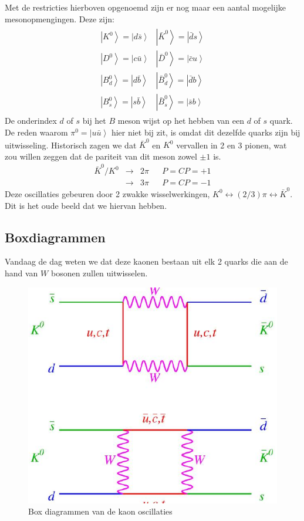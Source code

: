 \documentclass[../main.tex]{subfiles}
\begin{document}
Met de restricties hierboven opgenoemd zijn er nog maar een aantal mogelijke mesonopmengingen. Deze zijn:
\begin{equation}
    \begin{aligned}
        \label{eq:mogelijke_meson_opmengingen}
        \begin{array}{ll}
            \left|K^{0}\right>=\left| d \bar{s}\right> & \left|\bar{K}^{0}\right>=\left| \bar{d} s\right> \\
            \left|D^{0}\right>=\left| c \bar{u}\right> & \left|\bar{D}^{0}\right>=\left| \bar{c} u\right> \\
            \left|B_{d}^{0}\right>=\left| d \bar{b}\right> & \left|\bar{B}_{d}^{0}\right>=\left| \bar{d} b\right> \\
            \left|B_{s}^{0}\right>=\left| s \bar{b}\right> & \left|\bar{B}_{s}^{0}\right>=\left| \bar{s} b\right>
        \end{array}
    \end{aligned}
\end{equation}
De onderindex $d$ of $s$ bij het $B$ meson wijst op het hebben van een $d$ of $s$ quark. De reden waarom $\pi^0=\left|u\bar{u}\right>$ hier niet bij zit, is omdat dit dezelfde quarks zijn bij uitwisseling. Historisch zagen we dat $\bar{K}^{0}$ en $K^{0}$ vervallen in 2 en 3 pionen, wat zou willen zeggen dat de pariteit van dit meson zowel $\pm1$ is.
\begin{equation}
    \begin{aligned}
        \label{eq:kaon_pion_verval}
            \bar{K}^{0} / K^{0} & \rightarrow & 2 \pi & & P=C P=+1 \\
                                & \rightarrow & 3 \pi & & P=C P=-1
    \end{aligned}
\end{equation}
Deze oscillaties gebeuren door 2 zwakke wisselwerkingen, $K^{0} \leftrightarrow(2 / 3) \pi \leftrightarrow \bar{K}^{0}$. Dit is het oude beeld dat we hiervan hebben.

\subsection{Boxdiagrammen}%
\label{sub:box_diagrammen}

Vandaag de dag weten we dat deze kaonen bestaan uit elk 2 quarks die aan de hand van $W$ bosonen zullen uitwisselen.

\begin{figure}[h]
    \centering
    \includegraphics[width=0.4\linewidth]{meson_mixing_and_oscillations/box_diagrams.png}
    \caption{Box diagrammen van de kaon oscillaties}%
    \label{fig:meson_mixing_and_oscillations/box_diagrams}
\end{figure}
\end{document}
